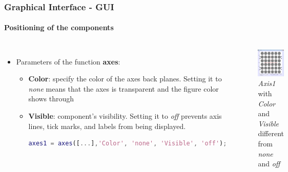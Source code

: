 \documentclass[10pt]{beamer}
\begin{document}
\begin{frame}[fragile]

\frametitle{Graphical Interface - GUI}
\framesubtitle{Positioning of the components}
	\begin{columns}
		
		\begin {itemize}
		\item Parameters of the function  \textbf{axes}:
	
	\begin{itemize}
	  
 
		\item \textbf{Color}: specify the color of the axes back planes. Setting it to
		\textit{none} means that the axes is transparent and the figure color shows through
		\item \textbf{Visible}: component's visibility. Setting it to
		\textit{off} prevents axis lines, tick marks, and labels from being displayed.\\
\begin{lstlisting}[language=Matlab]
axes1 = axes([...],'Color', 'none', 'Visible', 'off');
\end{lstlisting}

	\end{itemize}
	\end{itemize}
		
		\begin{figure}[h]
		\centering
		\includegraphics[scale=.30]{images/noeffects}
		\caption{\textit{Axis1} with \textit{Color} and \textit{Visible} 
different from \textit{none} and \textit{off}}
		\label{fig:noeffects}
		\end{figure}

	\end{columns}

\end{frame}
\end{document}
